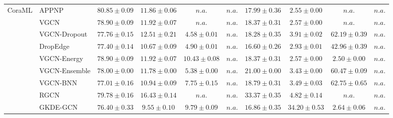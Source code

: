 \begin{table*}[!h]
{\begin{tabular}{ll|cccc|cccc}
        \multirow{10}{*}{CoraML}
        & APPNP & ${80.85\scriptscriptstyle \pm 0.09}$ & ${11.86\scriptscriptstyle \pm 0.06}$ & $n.a.$ & $n.a.$ & ${17.99\scriptscriptstyle \pm 0.36}$ & ${2.55\scriptscriptstyle \pm 0.00}$ & $n.a.$ & $n.a.$\\
        & VGCN & ${78.90\scriptscriptstyle \pm 0.09}$ & ${11.92\scriptscriptstyle \pm 0.07}$ & $n.a.$ & $n.a.$ & ${18.37\scriptscriptstyle \pm 0.31}$ & ${2.57\scriptscriptstyle \pm 0.00}$ & $n.a.$ & $n.a.$\\
        & VGCN-Dropout & ${77.76\scriptscriptstyle \pm 0.15}$ & ${12.51\scriptscriptstyle \pm 0.21}$ & ${4.58\scriptscriptstyle \pm 0.01}$ & $n.a.$ & ${18.28\scriptscriptstyle \pm 0.35}$ & ${3.91\scriptscriptstyle \pm 0.02}$ & ${62.19\scriptscriptstyle \pm 0.39}$ & $n.a.$\\
        & DropEdge & ${77.40\scriptscriptstyle \pm 0.14}$ & ${10.67\scriptscriptstyle \pm 0.09}$ & ${4.90\scriptscriptstyle \pm 0.01}$ & $n.a.$ & ${16.60\scriptscriptstyle \pm 0.26}$ & ${2.93\scriptscriptstyle \pm 0.01}$ & ${42.96\scriptscriptstyle \pm 0.39}$ & $n.a.$\\
        & VGCN-Energy & ${78.90\scriptscriptstyle \pm 0.09}$ & ${11.92\scriptscriptstyle \pm 0.07}$ & ${{10.43}\scriptscriptstyle \pm 0.08}$ & $n.a.$ & ${18.37\scriptscriptstyle \pm 0.31}$ & ${2.57\scriptscriptstyle \pm 0.00}$ & ${2.50\scriptscriptstyle \pm 0.00}$ & $n.a.$\\
        & VGCN-Ensemble & ${78.00\scriptscriptstyle \pm 0.00}$ & ${11.78\scriptscriptstyle \pm 0.00}$ & ${5.38\scriptscriptstyle \pm 0.00}$ & $n.a.$ & ${21.00\scriptscriptstyle \pm 0.00}$ & ${3.43\scriptscriptstyle \pm 0.00}$ & ${60.47\scriptscriptstyle \pm 0.09}$ & $n.a.$\\
        & VGCN-BNN & ${77.01\scriptscriptstyle \pm 0.16}$ & ${10.94\scriptscriptstyle \pm 0.09}$ & ${7.75\scriptscriptstyle \pm 0.15}$ & $n.a.$ & ${18.79\scriptscriptstyle \pm 0.31}$ & ${3.49\scriptscriptstyle \pm 0.03}$ & ${{62.75}\scriptscriptstyle \pm 0.65}$ & $n.a.$\\
        & RGCN & ${79.78\scriptscriptstyle \pm 0.16}$ & ${{16.43}\scriptscriptstyle \pm 0.14}$ & $n.a.$ & $n.a.$ & ${33.37\scriptscriptstyle \pm 0.35}$ & ${4.82\scriptscriptstyle \pm 0.14}$ & $n.a.$ & $n.a.$\\
        & GKDE-GCN & ${76.40\scriptscriptstyle \pm 0.33}$ & ${9.55\scriptscriptstyle \pm 0.10}$ & ${9.79\scriptscriptstyle \pm 0.09}$ & $n.a.$ & ${16.86\scriptscriptstyle \pm 0.35}$ & ${{34.20}\scriptscriptstyle \pm 0.53}$ & ${2.64\scriptscriptstyle \pm 0.06}$ & $n.a.$\\

\end{tabular}}
\end{table*}

